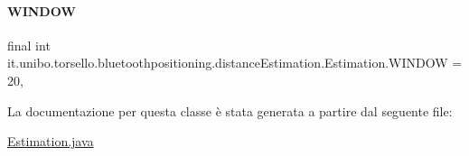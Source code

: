 \hypertarget{classit_1_1unibo_1_1torsello_1_1bluetoothpositioning_1_1distanceEstimation_1_1Estimation_ac683779da2d71df64057d729a8298954_ac683779da2d71df64057d729a8298954}{}\label{classit_1_1unibo_1_1torsello_1_1bluetoothpositioning_1_1distanceEstimation_1_1Estimation_ac683779da2d71df64057d729a8298954_ac683779da2d71df64057d729a8298954} 
\paragraph{\texorpdfstring{W\+I\+N\+D\+OW}{WINDOW}}
{\footnotesize\ttfamily final int it.\+unibo.\+torsello.\+bluetoothpositioning.\+distance\+Estimation.\+Estimation.\+W\+I\+N\+D\+OW = 20\hspace{0.3cm}{\ttfamily [static]}, {\ttfamily [private]}}



La documentazione per questa classe è stata generata a partire dal seguente file\+:\begin{DoxyCompactItemize}
\item 
\hyperlink{Estimation_8java}{Estimation.\+java}\end{DoxyCompactItemize}
